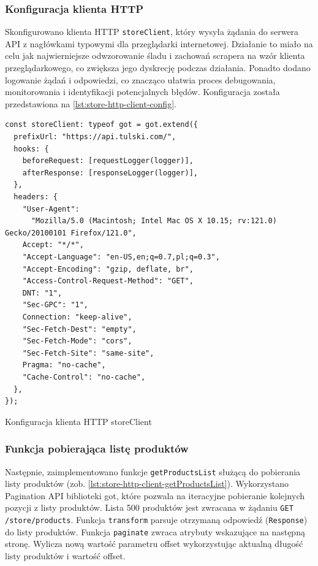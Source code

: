 \subsubsection{Konfiguracja klienta HTTP}\label{subsubsec:storeclient}

Skonfigurowano klienta HTTP \texttt{storeClient}, który wysyła żądania do serwera API z nagłówkami typowymi dla przeglądarki internetowej.
Działanie to miało na celu jak najwierniejsze odwzorowanie śladu i zachowań scrapera na wzór klienta przeglądarkowego, co zwiększa jego dyskrecję podczas działania.
Ponadto dodano logowanie żądań i odpowiedzi, co znacząco ułatwia proces debugowania, monitorowania i identyfikacji potencjalnych błędów.
Konfiguracja została przedstawiona na \autoref{lst:store-http-client-config}.

\begin{listing}[H]
    \begin{verbatim}
const storeClient: typeof got = got.extend({
  prefixUrl: "https://api.tulski.com/",
  hooks: {
    beforeRequest: [requestLogger(logger)],
    afterResponse: [responseLogger(logger)],
  },
  headers: {
    "User-Agent":
      "Mozilla/5.0 (Macintosh; Intel Mac OS X 10.15; rv:121.0) Gecko/20100101 Firefox/121.0",
    Accept: "*/*",
    "Accept-Language": "en-US,en;q=0.7,pl;q=0.3",
    "Accept-Encoding": "gzip, deflate, br",
    "Access-Control-Request-Method": "GET",
    DNT: "1",
    "Sec-GPC": "1",
    Connection: "keep-alive",
    "Sec-Fetch-Dest": "empty",
    "Sec-Fetch-Mode": "cors",
    "Sec-Fetch-Site": "same-site",
    Pragma: "no-cache",
    "Cache-Control": "no-cache",
  },
});
    \end{verbatim}
    \caption{Konfiguracja klienta HTTP storeClient}
    \label{lst:store-http-client-config}
\end{listing}

\subsubsection{Funkcja pobierająca listę produktów}

Następnie, zaimplementowano funkcje \texttt{getProductsList} służącą do pobierania listy produktów (zob. \autoref{lst:store-http-client-getProductsList}).
Wykorzystano Pagination API biblioteki got\cite{got-paginate-docs}, które pozwala na iteracyjne pobieranie kolejnych pozycji z listy produktów.
Lista 500 produktów jest zwracana w żądaniu \texttt{GET /store/products}.
Funkcja \texttt{transform} parsuje otrzymaną odpowiedź (\texttt{Response}) do listy produktów.
Funkcja \texttt{paginate} zwraca atrybuty wskazujące na następną stronę. Wylicza nową wartość parametru offset wykorzystując aktualną długość listy produktów i wartość offset.

